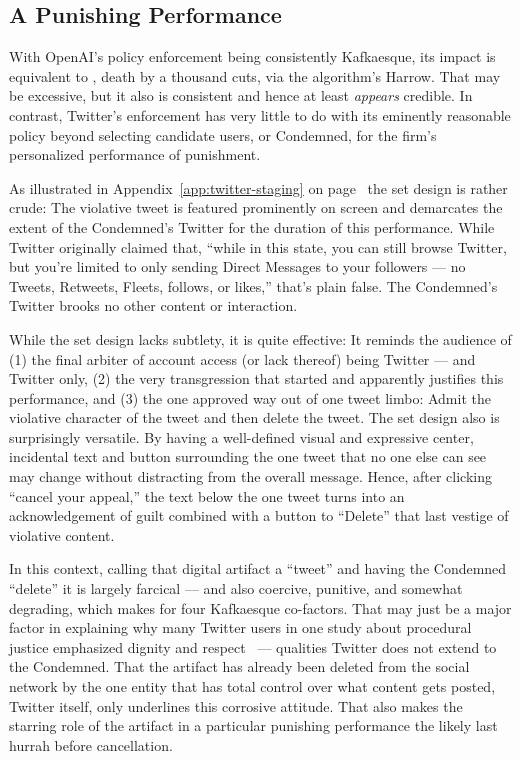 \subsection{A Punishing Performance}

With OpenAI's policy enforcement being consistently Kafkaesque, its impact is
equivalent to \lingchi, death by a thousand cuts, via the algorithm's Harrow.
That may be excessive, but it also is consistent and hence at least
\emph{appears} credible. In contrast, Twitter's enforcement has very little to
do with its eminently reasonable policy beyond selecting candidate users, or
Condemned, for the firm's personalized performance of punishment.

As illustrated in Appendix~\ref{app:twitter-staging} on
page~\pageref{app:twitter-staging} the set design is rather crude: The
violative tweet is featured prominently on screen and demarcates the extent of
the Condemned's Twitter for the duration of this performance. While Twitter
originally claimed that, ``while in this state, you can still browse Twitter,
but you're limited to only sending Direct Messages to your followers --- no
Tweets, Retweets, Fleets, follows, or likes,'' that's plain false. The
Condemned's Twitter brooks no other content or interaction.

While the set design lacks subtlety, it is quite effective: It reminds the
audience of (1) the final arbiter of account access (or lack thereof) being
Twitter --- and Twitter only, (2) the very transgression that started and
apparently justifies this performance, and (3) the one approved way out of one
tweet limbo: Admit the violative character of the tweet and then delete the
tweet. The set design also is surprisingly versatile. By having a well-defined
visual and expressive center, incidental text and button surrounding the one
tweet that no one else can see may change without distracting from the overall
message. Hence, after clicking ``cancel your appeal,'' the text below the one
tweet turns into an acknowledgement of guilt combined with a button to
``Delete'' that last vestige of violative content.

In this context, calling that digital artifact a ``tweet'' and having the
Condemned ``delete'' it is largely farcical --- and also coercive, punitive, and
somewhat degrading, which makes for four Kafkaesque co-factors. That may just be
a major factor in explaining why many Twitter users in one study about
procedural justice emphasized dignity and respect~\cite{KatsarosTylerea2022} ---
qualities Twitter does not extend to the Condemned. That the artifact has
already been deleted from the social network by the one entity that has total
control over what content gets posted, Twitter itself, only underlines this
corrosive attitude. That also makes the starring role of the artifact in a
particular punishing performance the likely last hurrah before cancellation.

